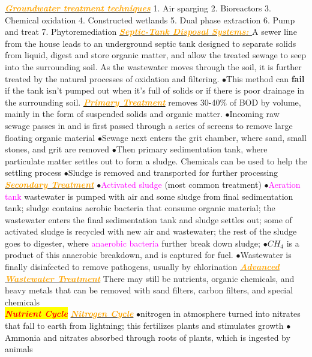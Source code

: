 \documentclass{article}
\newcommand{\ddd}{$\bullet$}
\newcommand{\red}[1]{\textcolor{red}{#1}}
\newcommand{\pink}[1]{\textcolor{magenta}{#1}}
\newcommand{\orange}[1]{\textcolor{orange}{#1}}
\newcommand{\mysection}[1]{\colorbox{yellow}{\textbf{\textit{\red{#1}}}}}
\newcommand{\mysubsection}[1]{\underline{\textbf{{\textit{\orange{#1}}}}}}
\newcommand{\vocab}[1]{{\pink{#1}}}
\begin{document}
\begin{multicols*}{4}
        \mysubsection{Groundwater treatment techniques}
             1. Air sparging 2. Bioreactors 3. Chemical oxidation 4. Constructed wetlands 5. Dual phase extraction 6. Pump and treat 7. Phytoremediation
        \mysubsection{Septic-Tank Disposal Systems: }
            A sewer line from the house leads to an underground septic tank designed to separate solids from liquid, digest and store organic matter, and allow the treated sewage to seep into the surrounding soil. As the wastewater moves through the soil, it is further treated by the natural processes of oxidation and filtering.
            \ddd This method can \textbf{fail} if the tank isn't pumped out when it's full of solids or if there is poor drainage in the surrounding soil.
        \mysubsection{Primary Treatment} 
            removes 30-40\% of BOD by volume, mainly in the form of suspended solids and organic matter. 
            \ddd Incoming raw sewage passes in and is first passed through a series of screens to remove large floating organic material
            \ddd Sewage next enters the grit chamber, where sand, small stones, and grit are removed
            \ddd Then primary sedimentation tank, where particulate matter settles out to form a sludge. Chemicals can be used to help the settling process
            \ddd Sludge is removed and transported for further processing
    	 \mysubsection{Secondary Treatment}
    	    \ddd \vocab{Activated sludge} (most common treatment)
    	    \ddd \vocab{Aeration tank} wastewater is pumped with air and some sludge from final sedimentation tank; sludge contains aerobic bacteria that consume organic material; the wastewater enters the final sedimentation tank and sludge settles out; some of activated sludge is recycled with new air and wastewater; the rest of the sludge goes to digester, where \vocab{anaerobic bacteria} further break down sludge;
    	    \ddd $CH_4$ is a product of this anaerobic breakdown, and is captured for fuel. 
    	    \ddd Wastewater is finally disinfected to remove pathogens, usually by chlorination
    	  \mysubsection{Advanced Wastewater Treatment}
    	    There may still be nutrients, organic chemicals, and heavy metals that can be removed with sand filters, carbon filters, and special chemicals
    \\
    \mysection{Nutrient Cycle}
        \mysubsection{Nitrogen Cycle}
            \ddd nitrogen in atmosphere turned into nitrates that fall to earth from lightning; this fertilizes plants and stimulates growth
            \ddd Ammonia and nitrates absorbed through roots of plants, which is ingested by animals

\end{multicols*}
\end{document}
